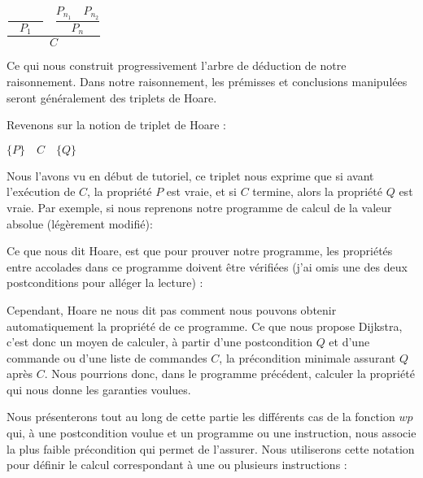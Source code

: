 \begin{center}
$\dfrac{\dfrac{}{\quad P_1\quad} \quad \dfrac{P_{n_1}\quad P_{n_2}}{P_n}}{C}$


\end{center}


Ce qui nous construit progressivement l'arbre de déduction de notre raisonnement.
Dans notre raisonnement, les prémisses et conclusions manipulées seront 
généralement des triplets de Hoare.





Revenons sur la notion de triplet de Hoare :




\begin{center}
$\{ P \}\quad  C\quad \{ Q \}$


\end{center}


Nous l'avons vu en début de tutoriel, ce triplet nous exprime que si avant 
l'exécution de $C$, la propriété $P$ est vraie, et si $C$ termine, alors la
propriété $Q$ est vraie. Par exemple, si nous reprenons notre programme de
calcul de la valeur absolue (légèrement modifié):






Ce que nous dit Hoare, est que pour prouver notre programme, les propriétés
entre accolades dans ce programme doivent être vérifiées (j'ai omis une des
deux postconditions pour alléger la lecture) :






Cependant, Hoare ne nous dit pas comment nous pouvons obtenir automatiquement la 
propriété  de ce programme. Ce que nous propose Dijkstra, c'est donc un moyen
de calculer, à partir d'une postcondition $Q$ et d'une commande ou d'une liste de 
commandes $C$, la précondition minimale assurant $Q$ après $C$. Nous pourrions 
donc, dans le programme précédent, calculer la propriété  qui nous donne les
garanties voulues.



Nous présenterons tout au long de cette partie les différents cas de la 
fonction $wp$ qui, à une postcondition voulue et un programme ou une instruction,
nous associe la plus faible précondition qui permet de l'assurer. Nous utiliserons
cette notation pour définir le calcul correspondant à une ou plusieurs instructions :



